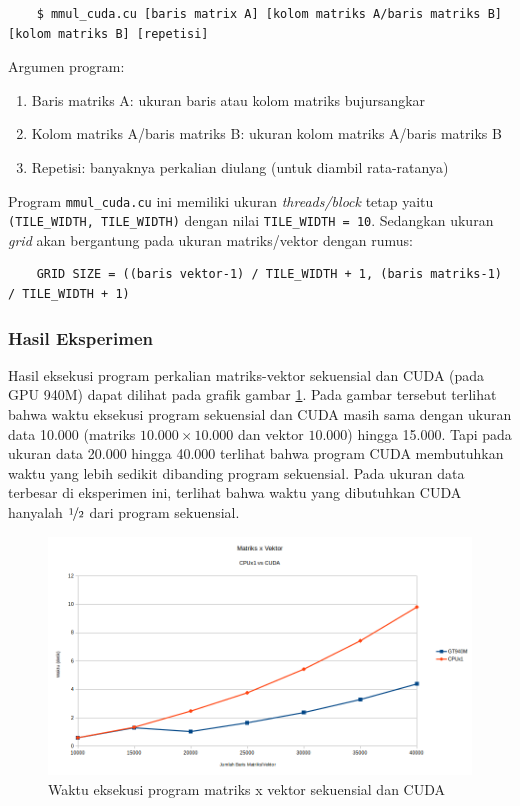 \begin{enumerate}
	\begin{lstlisting}
	$ mmul_cuda.cu [baris matrix A] [kolom matriks A/baris matriks B] [kolom matriks B] [repetisi]
	\end{lstlisting}
	
	Argumen program:
	\begin{enumerate}
		\item Baris matriks A: ukuran baris atau kolom matriks bujursangkar
		\item Kolom matriks A/baris matriks B: ukuran kolom matriks A/baris matriks B
		\item Repetisi: banyaknya perkalian diulang (untuk diambil rata-ratanya)
	\end{enumerate}
	
	Program \verb|mmul_cuda.cu| ini memiliki ukuran \textit{threads/block} tetap yaitu \verb|(TILE_WIDTH, TILE_WIDTH)| dengan nilai \verb|TILE_WIDTH = 10|. Sedangkan ukuran \textit{grid} akan bergantung pada ukuran matriks/vektor dengan rumus:
	
	\begin{lstlisting}
	GRID SIZE = ((baris vektor-1) / TILE_WIDTH + 1, (baris matriks-1) / TILE_WIDTH + 1)
	\end{lstlisting}
	
\end{enumerate}

\subsubsection{Hasil Eksperimen}

Hasil eksekusi program perkalian matriks-vektor sekuensial dan CUDA (pada GPU 940M) dapat dilihat pada grafik gambar \ref{fig:seq_cuda_mv_940}. Pada gambar tersebut terlihat bahwa waktu eksekusi program sekuensial dan CUDA masih sama dengan ukuran data 10.000 (matriks $10.000 \times 10.000$ dan vektor $10.000$) hingga 15.000. Tapi pada ukuran data 20.000 hingga 40.000 terlihat bahwa program CUDA membutuhkan waktu yang lebih sedikit dibanding program sekuensial. Pada ukuran data terbesar di eksperimen ini, terlihat bahwa waktu yang dibutuhkan CUDA hanyalah $\nicefrac{1}{2}$ dari program sekuensial.

\begin{figure}
	\centering
	\includegraphics[width=1\textwidth]
	{pics/seq_cuda_mv_940}
	\caption{Waktu eksekusi program matriks x vektor sekuensial dan CUDA}
	\label{fig:seq_cuda_mv_940}
\end{figure}  

